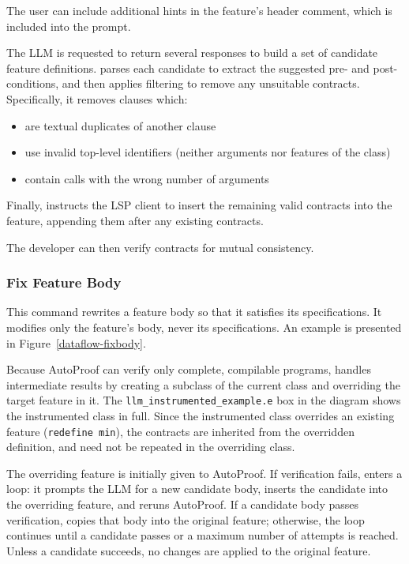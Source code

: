 \documentclass[runningheads]{llncs}
\newcommand{\figref}[1]{Figure~\ref{#1}}
\begin{document}
The user can include additional hints in the feature's header comment, which is included into the prompt.

The LLM is requested to return several responses to build a set of candidate feature definitions.
\toolname{} parses each candidate to extract the suggested pre- and post-conditions,
and then applies filtering to remove any unsuitable contracts.
Specifically, it removes clauses which:

\begin{itemize}
    \item are textual duplicates of another clause
    \item use invalid top-level identifiers (neither arguments nor features of the class)
    \item contain calls with the wrong number of arguments
\end{itemize}

Finally, \toolname{} instructs the LSP client to insert the remaining valid contracts into the feature,
appending them after any existing contracts.

The developer can then verify contracts for mutual consistency.


\subsubsection{Fix Feature Body}\label{fix-feature-body}
This command rewrites a feature body so that it satisfies its specifications.
It modifies only the feature's body, never its specifications.
An example is presented in \figref{dataflow-fixbody}.


Because AutoProof can verify only complete, compilable programs,
\toolname{} handles intermediate results by creating a subclass of the current
class and overriding the target feature in it. The \texttt{llm\_instrumented\_example.e} box
in the diagram shows the instrumented class in full. Since the instrumented class
overrides an existing feature (\lstinline|redefine min|), the contracts are
inherited from the overridden definition, and need not be repeated in the
overriding class.

The overriding feature is initially given to AutoProof.
If verification fails, \toolname{} enters a loop: it prompts the LLM for a new candidate body, inserts the candidate into the overriding feature, and reruns AutoProof.
If a candidate body passes verification, \toolname{} copies that body into the original feature; otherwise, the loop continues until a candidate passes or a maximum number of attempts is reached.
Unless a candidate succeeds, no changes are applied to the original feature.
\end{document}
